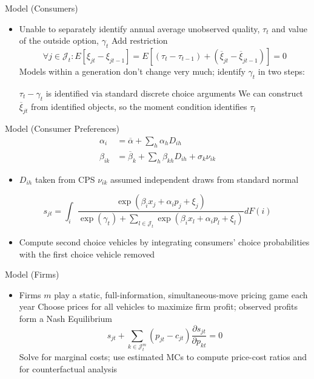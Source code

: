 \documentclass{beamer}
\begin{document}
%
\begin{frame}{Model (Consumers)}
  \begin{itemize}
  \item Unable to separately identify annual average unobserved quality, $\tau_t$ and value of the outside option, $\gamma_t$
    \vitem Add restriction
    \[
\forall j \in \mathcal{J}_t: E[\xi_{jt} - \xi_{jt - 1}] = E[(\tau_t -\tau_{t - 1}) + (\overline{\xi}_{jt} - \overline{\xi}_{jt - 1})] = 0
    \]
    \vitem Models within a generation don't change very much; identify $\gamma_t$ in two steps:
    \begin{enumerate}
    \vitem $\tau_t - \gamma_t$ is identified via standard discrete choice arguments
      \vitem We can construct $\overline{\xi}_{jt}$ from identified objects, so the moment condition identifies $\tau_t$
    \end{enumerate}
  \end{itemize}
\end{frame}
%
\begin{frame}{Model (Consumer Preferences)}
  \begin{align*}
    \alpha_i &= \overline{\alpha} + \sum_h \alpha_h D_{ih}\\
    \beta_{ik} &= \overline{\beta}_k + \sum_h \beta_{kh} D_{ih} + \sigma_k \nu_{ik} 
  \end{align*}
  \begin{itemize}
  \item $D_{ih}$ taken from CPS
    \vitem $\nu_{ik}$ assumed independent draws from standard normal
  \end{itemize}
  \vfill
  \[
s_{jt} = \int_i \frac{\exp (\beta_i x_j + \alpha_i p_j + \xi_j)}{\exp (\gamma_t) + \sum_{l \in \mathcal{J}_t} \exp (\beta_i x_l + \alpha_i p_l + \xi_l)} dF(i)
  \]
  \begin{itemize}
  \item Compute second choice vehicles by integrating consumers' choice probabilities with the first choice vehicle removed
  \end{itemize}
\end{frame}
%
\begin{frame}{Model (Firms)}
  \begin{itemize}
  \item Firms $m$ play a static, full-information, simultaneous-move pricing game each year
    \vitem Choose prices for all vehicles to maximize firm profit; observed profits form a Nash Equilibrium
    \[
s_{jt} + \sum_{k \in \mathcal{J}_t^m }(p_{jt} - c_{jt}) \frac{\partial s_{jt}}{\partial p_{kt}} = 0 \tag{FOC}
    \]
    \vitem Solve for marginal costs; use estimated MCs to compute price-cost ratios and for counterfactual analysis
  \end{itemize}
\end{frame}
\end{document}
